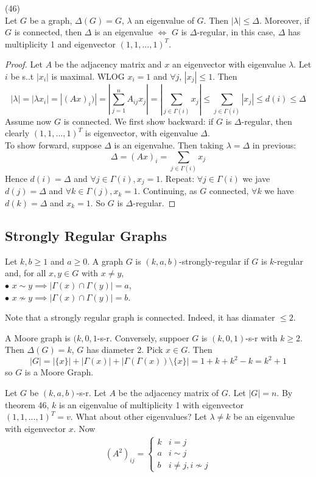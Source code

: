 \documentclass[a4paper]{article}
\begin{document}
\begin{thm} (46)\\
Let $G$ be a graph, $\Delta(G) = G$, $\lambda$ an eigenvalue of $G$. Then $|\lambda| \leq \Delta$. Moreover, if $G$ is connected, then $\Delta$ is an eigenvalue $\iff$ $G$ is $\Delta$-regular, in this case, $\Delta$ has multiplicity 1 and eigenvector $(1,1,...,1)^T$.
\begin{proof}
Let $A$ be the adjacency matrix and $x$ an eigenvector with eigenvalue $\lambda$. Let $i$ be s..t $|x_i|$ is maximal. WLOG $x_i = 1$ and $\forall j$, $|x_j| \leq 1$. Then $$|\lambda| = |\lambda x_i| = |(Ax)_i)| = |\sum_{j=1}^n A_{ij}x_j| = |\sum_{j \in \Gamma(i)}x_j| \leq \sum_{j \in \Gamma(i)} |x_j| \leq d(i) \leq \Delta$$
Assume now $G$ is connected. We first show backward: if $G$ is $\Delta$-regular, then clearly $(1,1,...,1)^T$ is eigenvector, with eigenvalue $\Delta$.\\
To show forward, suppose $\Delta$ is an eigenvalue. Then taking $\lambda = \Delta$ in previous: $$\Delta = (Ax)_i = \sum_{j \in \Gamma(i)} x_j$$ Hence $d(i) = \Delta$ and $\forall j \in \Gamma(i), x_j = 1$. Repeat: $\forall j \in \Gamma(i)$ we jave $d(j) = \Delta$ and $\forall k \in \Gamma(j), x_k = 1$. Continuing, as $G$ connected, $\forall k$ we have $d(k) = \Delta$ and $x_k=1$. So $G$ is $\Delta$-regular.
\end{proof}
\end{thm}

\subsection{Strongly Regular Graphs}

Let $k,b \geq 1$ and $a \geq 0$. A graph $G$ is $(k,a,b)$-strongly-regular if $G$ is $k$-regular and, for all $x,y \in G$ with $x \neq y$,\\
$\bullet$ $x \sim y \implies |\Gamma(x) \cap \Gamma(y)| = a$,\\
$\bullet$ $x \not\sim y \implies |\Gamma(x) \cap \Gamma(y)| = b$.

Note that a strongly regular graph is connected. Indeed, it has diamater $\leq 2$.

A Moore graph is $(k,0,1$-s-r. Conversely, suppoer $G$ is $(k,0,1)$-s-r with $k \geq 2$. Then $\Delta(G) = k$, $G$ has diameter 2. Pick $x \in G$. Then $$|G| = |\{x\}| + |\Gamma(x)| + |\Gamma(\Gamma(x)) \setminus \{x\} |=1+k+k^2-k = k^2+1$$ so $G$ is a Moore Graph.

Let $G$ be $(k,a,b)$-s-r. Let $A$ be the adjacency matrix of $G$. Let $|G| = n$. By theorem 46, $k$ is an eigenvalue of multiplicity 1 with eigenvector $(1,1,...,1)^T = v$. What about other eigenvalues? Let $\lambda \neq k$ be an eigenvalue with eigenvector $x$. Now
\begin{equation*}
\begin{aligned}
(A^2)_{ij} = \left\{ \begin{array}{ll}
k & i = j\\
a & i \sim j\\
b & i \neq j, i \not\sim j
\end{array}
\right.
\end{aligned}
\end{equation*}
\end{document}
